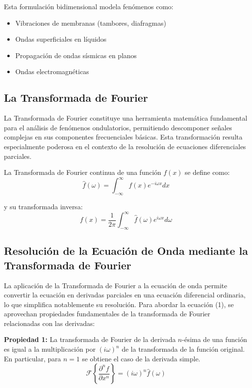 \documentclass[a4paper]{article}
\begin{document}
Esta formulación bidimensional modela fenómenos como:

\begin{itemize}
    \item Vibraciones de membranas (tambores, diafragmas)
    \item Ondas superficiales en líquidos
    \item Propagación de ondas sísmicas en planos
    \item Ondas electromagnéticas
\end{itemize}

\subsection{La Transformada de Fourier}

La Transformada de Fourier constituye una herramienta matemática fundamental para el análisis de fenómenos ondulatorios, permitiendo
descomponer señales complejas en sus componentes frecuenciales básicas. Esta transformación resulta especialmente poderosa en el
contexto de la resolución de ecuaciones diferenciales parciales.

La Transformada de Fourier continua de una función $f(x)$ se define como:
\begin{equation}
    \hat{f}(\omega) = \int_{-\infty}^{\infty} f(x) e^{-i\omega x} dx
\end{equation}

y su transformada inversa:
\begin{equation}
    f(x) = \frac{1}{2\pi} \int_{-\infty}^{\infty} \hat{f}(\omega) e^{i\omega x} d\omega
\end{equation}

\subsection{Resolución de la Ecuación de Onda mediante la Transformada de Fourier}

La aplicación de la Transformada de Fourier a la ecuación de onda permite convertir la ecuación en derivadas parciales en una ecuación diferencial ordinaria,
lo que simplifica notablemente su resolución. Para abordar la ecuación (1), se aprovechan propiedades fundamentales de la transformada de Fourier relacionadas con las derivadas:

\textbf{Propiedad 1:} La transformada de Fourier de la derivada $n$-ésima de una función es igual a la multiplicación por $(i\omega)^n$ de la transformada de la función original. En particular, para $n=1$ se obtiene el caso de la derivada simple.
\begin{equation}
    \mathcal{F}\left\{\frac{\partial^n f}{\partial x^n}\right\} = (i\omega)^n \hat{f}(\omega)
\end{equation}
\end{document}
